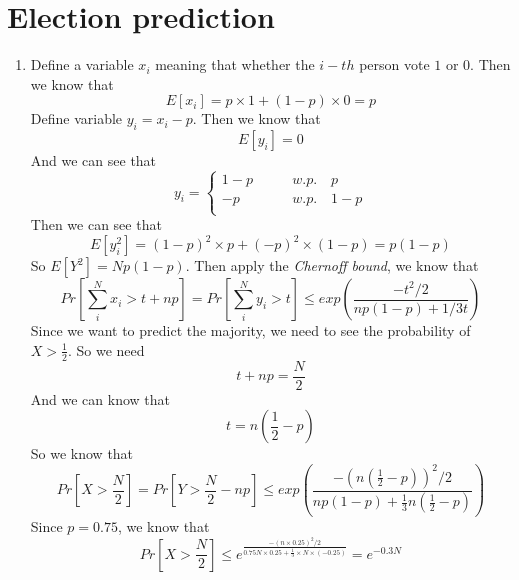 \documentclass{article}
\begin{document}
	\section{Election prediction}
		\begin{enumerate}
			\item Define a variable $x_i$ meaning that whether the $i-th$ person vote $1$ or $0$. Then we know that \begin{equation}
				E\left[x_i\right] = p \times 1 + ( 1-  p) \times 0 = p
				\end{equation}
				Define variable $y_i = x_i - p$. Then we know that \begin{equation}
					E\left[y_i\right] = 0
				\end{equation}
				And we can see that \begin{equation}
					y_i = \left\{ \begin{aligned} 
						1 - p & \qquad w.p. \quad p \\
						-p & \qquad w.p. \quad 1-p \\
						\end{aligned}\right.\end{equation}
				Then we can see that \begin{equation}
					E\left[y_i^2\right] = (1 - p)^2 \times p + (-p)^2 \times (1 - p) = p(1 - p)
				\end{equation}
				So $E\left[Y^2\right] = Np(1 - p) $.
				Then apply the \emph{Chernoff bound}, we know that \begin{equation}
					Pr\left[\sum_i^N x_i > t + np\right] = Pr\left[\sum_i^N y_i > t\right] \leq exp(\frac{-t^2/2}{np(1 - p) + 1/3t})
				\end{equation}
				Since we want to predict the majority, we need to see the probability of $X > \frac{1}{2}$. So we need \begin{equation}
					t + np = \frac{N}{2}
				\end{equation}
				And we can know that \begin{equation}
					t = n(\frac{1}{2} - p)
				\end{equation}
				So we know that \begin{equation}
					Pr\left[X > \frac{N}{2}\right] = Pr\left[Y > \frac{N}{2} - np\right] \leq exp(\frac{-(n(\frac{1}{2} - p))^2 / 2}{np(1 - p) + \frac{1}{3}n(\frac{1}{2} - p)})
					\end{equation}
				Since $p = 0.75$, we know that \begin{equation}
					Pr\left[X > \frac{N}{2}\right] \leq e^{\frac{-(n\times0.25)^2 / 2}{0.75N \times 0.25 + \frac{1}{3} \times N \times (-0.25)}} = e^{-0.3N}

\end{equation}
\end{enumerate}
\end{document}
